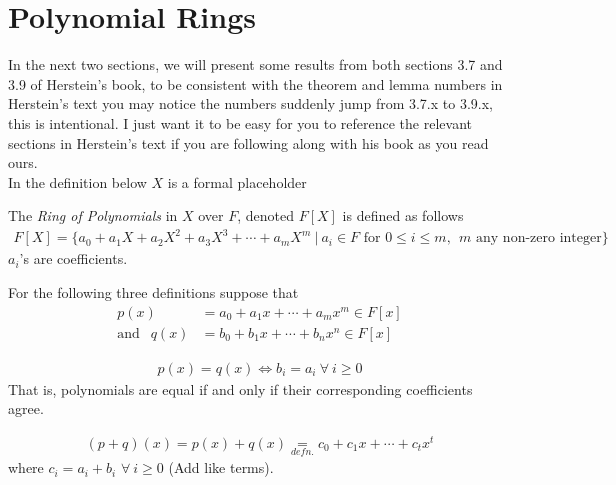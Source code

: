 \section{Polynomial Rings}
In the next two sections,  we will present some results from both sections 3.7 and 3.9 of Herstein's book, to be consistent with the theorem and lemma numbers in Herstein's text you may notice the numbers suddenly jump from 3.7.x to 3.9.x, this is intentional. I just want it to be easy for you to reference the relevant sections in Herstein's text if you are following along with his book as you read ours. \\
\newpage 
\noindent In the definition below $X$ is a formal placeholder
\begin{definition}
    The \textit{Ring of Polynomials} in $X$ over $F$, denoted $F[X]$ is defined as follows
    \begin{align}
        F[X]= \{a_0 + a_1X + a_2X^2 + a_3X^3 + \cdots + a_m X^m \ | \ a_i \in F \text{ for } 0\leq i \leq m, \ \ m \text{ any non-zero integer}\} \nonumber
    \end{align}
    $a_i$'s are coefficients.
\end{definition}

\noindent For the following three definitions suppose that
\begin{align}
    p(x)&= a_0 + a_1x + \cdots + a_mx^m \in F[x] \nonumber \\
    \text{and } \ \ q(x)&= b_0+b_1x+\cdots + b_n x^n \in F[x] \nonumber
\end{align}

\begin{definition}
    \begin{align}
        p(x)=q(x) \iff b_i = a_i \ \forall \ i \geq 0 \nonumber 
    \end{align}
    That is, polynomials are equal if and only if their corresponding coefficients agree.
\end{definition}

\begin{definition}
    \begin{align}
        (p+q)(x)= p(x)+q(x) \underset{defn.}{=}c_0 + c_1x + \cdots + c_t x^t \nonumber
    \end{align}
    where $c_i = a_i+b_i$ $\forall \ i\geq 0$ (Add like terms).
\end{definition}

